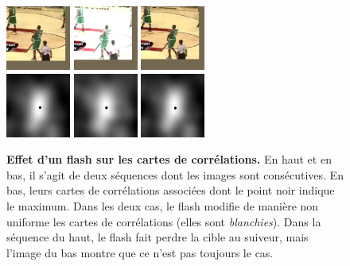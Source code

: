 \documentclass[10pt,twocolumn,letterpaper,french]{article}
\begin{document}
\begin{figure}[!h]
  \includegraphics[width=60pt]{images/vids/basketflash/700/000699.png}
  \includegraphics[width=60pt]{images/vids/basketflash/700/000700.png}
  \includegraphics[width=60pt]{images/vids/basketflash/700/000701.png}\\
  \includegraphics[width=60pt]{images/vids/basketflash/700/corr/000699.png}
  \includegraphics[width=60pt]{images/vids/basketflash/700/corr/000700.png}
  \includegraphics[width=60pt]{images/vids/basketflash/700/corr/000701.png} 
  \caption{\textbf{Effet d'un flash sur les cartes de corrélations.} En haut et en bas, il s'agit de deux séquences dont les images sont consécutives. En bas, leurs cartes de corrélations associées dont le point noir indique le maximum. Dans les deux cas, le flash modifie de manière non uniforme les cartes de corrélations (elles sont \textit{blanchies}). Dans la séquence du haut, le flash fait perdre la cible au suiveur, mais l'image du bas montre que ce n'est pas toujours le cas. }
  \label{flash}
  \end{figure}
\end{document}
